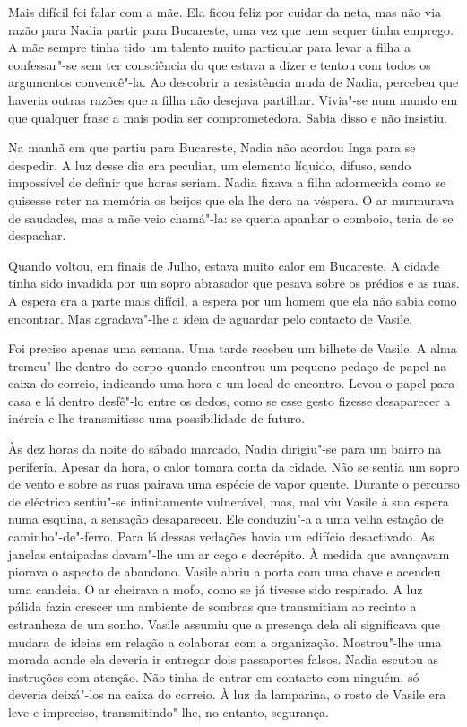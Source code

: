 Mais difícil foi falar com a mãe. Ela ficou feliz por cuidar da neta,
mas não via razão para Nadia partir para
Bucareste, uma vez que nem sequer tinha emprego. A mãe sempre tinha tido
um talento muito particular para levar a filha a confessar"-se sem ter
consciência do que estava a dizer e tentou com todos os argumentos
convencê"-la. Ao descobrir a resistência muda de Nadia, percebeu que
haveria outras razões que a filha não desejava partilhar. Vivia"-se num mundo em que qualquer frase a mais podia ser comprometedora.
Sabia disso e não insistiu.

Na manhã em que partiu para Bucareste, Nadia não acordou Inga para se
despedir. A luz desse dia era peculiar, um elemento líquido, difuso,
sendo impossível de definir que horas seriam. Nadia fixava a filha
adormecida como se quisesse reter na memória os beijos que ela lhe dera
na véspera. O ar murmurava de saudades, mas a mãe veio chamá"-la: se
queria apanhar o comboio, teria de se despachar.

Quando voltou, em finais de Julho, estava muito calor em Bucareste. A
cidade tinha sido invadida por um sopro abrasador que pesava sobre os
prédios e as ruas. A espera era a parte mais difícil, a espera por um
homem que ela não sabia como encontrar. Mas agradava"-lhe a ideia de
aguardar pelo contacto de Vasile.

Foi preciso apenas uma semana. Uma tarde recebeu um bilhete de Vasile. A
alma tremeu"-lhe dentro do corpo quando encontrou um pequeno pedaço de
papel na caixa do correio, indicando uma hora e um local de encontro.
Levou o papel para casa e lá dentro desfê"-lo entre os dedos, como se
esse gesto fizesse desaparecer a inércia e lhe transmitisse uma
possibilidade de futuro.

Às dez horas da noite do sábado marcado, Nadia dirigiu"-se para um
bairro na periferia. Apesar da hora, o calor tomara conta da cidade. Não
se sentia um sopro de vento e sobre as ruas pairava uma espécie de vapor
quente. Durante o percurso de eléctrico sentiu"-se infinitamente
vulnerável, mas, mal viu Vasile à sua espera numa esquina, a sensação
desapareceu. Ele conduziu"-a a uma velha estação de caminho"-de"-ferro.
Para lá dessas vedações havia um edifício desactivado. As janelas
entaipadas davam"-lhe um ar cego e decrépito. À medida que avançavam
piorava o aspecto de abandono. Vasile abriu a porta com uma chave e
acendeu uma candeia. O ar cheirava a mofo, como se já tivesse sido
respirado. A luz pálida fazia crescer um ambiente de sombras que
transmitiam ao recinto a estranheza de um sonho. Vasile assumiu que a
presença dela ali significava que mudara de ideias em relação a
colaborar com a organização. Mostrou"-lhe uma morada aonde ela deveria ir
entregar dois passaportes falsos. Nadia escutou as instruções com
atenção. Não tinha de entrar em contacto com ninguém, só deveria
deixá"-los na caixa do correio. À luz da lamparina, o rosto de Vasile era
leve e impreciso, transmitindo"-lhe, no entanto, segurança.

